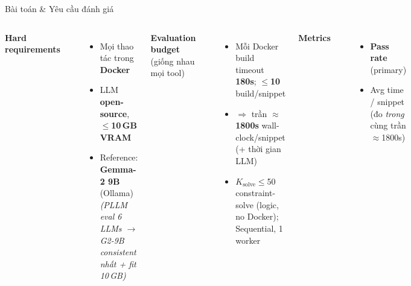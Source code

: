 \documentclass[aspectratio=169,10pt]{beamer}
\begin{document}
\begin{frame}{Bài toán \& Yêu cầu đánh giá}
\vspace{1.2em}
\begin{columns}[T,onlytextwidth]
\scriptsize
{\small\textbf{\color{mDarkTeal}Hard requirements}}\\[3pt]
\textcolor{mDarkTeal!22}{\rule{\linewidth}{0.5pt}}
\begin{itemize}\setlength{\itemsep}{2pt}\scriptsize
  \item Mọi thao tác trong \textbf{Docker}
  \item LLM \textbf{open-source}, $\le$\textbf{10\,GB VRAM}
  \item Reference: \textbf{Gemma-2 9B} (Ollama)\\
        {\tiny\color{gray}\textit{(PLLM eval 6 LLMs $\to$ G2-9B consistent nhất + fit 10\,GB)}}
\end{itemize}

\scriptsize
{\small\textbf{\color{mDarkTeal}Evaluation budget}} {\tiny\color{gray}(giống nhau mọi tool)}\\[3pt]
\textcolor{mDarkTeal!22}{\rule{\linewidth}{0.5pt}}
\begin{itemize}\setlength{\itemsep}{2pt}\scriptsize
  \item Mỗi Docker build timeout \textbf{180s}; $\le$\textbf{10} build/snippet
  \item $\Rightarrow$ trần \textbf{$\approx$1800s} wall-clock/snippet (+ thời gian LLM)
  \item $K_{\text{solve}}\le$50 constraint-solve {\tiny\color{gray}(logic, no Docker)}; Sequential, 1 worker
\end{itemize}

\scriptsize
{\small\textbf{\color{mDarkTeal}Metrics}}\\[3pt]
\textcolor{mDarkTeal!22}{\rule{\linewidth}{0.5pt}}
\begin{itemize}\setlength{\itemsep}{2pt}\scriptsize
  \item \textbf{Pass rate} (primary)
  \item Avg time / snippet \tiny\color{gray}(đo \emph{trong} cùng trần $\approx$1800s)
\end{itemize}
\end{columns}
\end{frame}
\end{document}
